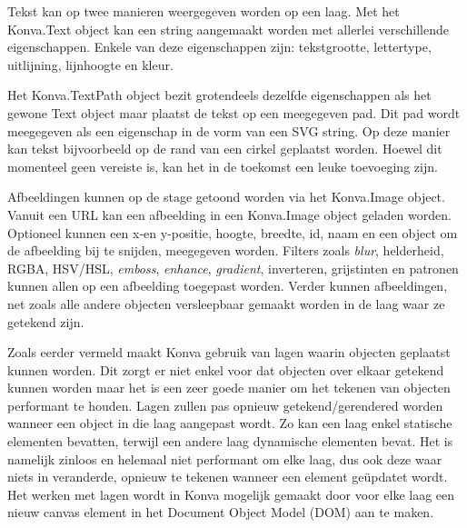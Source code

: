 Tekst kan op twee manieren weergegeven worden op een laag. Met het Konva.Text object kan een string aangemaakt worden met allerlei verschillende eigenschappen. Enkele van deze eigenschappen zijn: tekstgrootte, lettertype, uitlijning, lijnhoogte en kleur. 

Het Konva.TextPath object bezit grotendeels dezelfde eigenschappen als het gewone Text object maar plaatst de tekst op een meegegeven pad. Dit pad wordt meegegeven als een eigenschap in de vorm van een SVG string. Op deze manier kan tekst bijvoorbeeld op de rand van een cirkel geplaatst worden. Hoewel dit momenteel geen vereiste is, kan het in de toekomst een leuke toevoeging zijn.

Afbeeldingen kunnen op de stage getoond worden via het Konva.Image object. Vanuit een URL kan een afbeelding in een Konva.Image object geladen worden. Optioneel kunnen een x-en y-positie, hoogte, breedte, id, naam en een object om de afbeelding bij te snijden, meegegeven worden. Filters zoals \textit{blur}, helderheid, RGBA, HSV/HSL, \textit{emboss}, \textit{enhance}, \textit{gradient}, inverteren, grijstinten en patronen kunnen allen op een afbeelding toegepast worden. Verder kunnen afbeeldingen, net zoals alle andere objecten versleepbaar gemaakt worden in de laag waar ze getekend zijn. 

Zoals eerder vermeld maakt Konva gebruik van lagen waarin objecten geplaatst kunnen worden. Dit zorgt er niet enkel voor dat objecten over elkaar getekend kunnen worden maar het is een zeer goede manier om het tekenen van objecten performant te houden. Lagen zullen pas opnieuw getekend/gerendered worden wanneer een object in die laag aangepast wordt. Zo kan een laag enkel statische elementen bevatten, terwijl een andere laag dynamische elementen bevat. Het is namelijk zinloos en helemaal niet performant om elke laag, dus ook deze waar niets in veranderde, opnieuw te tekenen wanneer een element ge\"{u}pdatet wordt. Het werken met lagen wordt in Konva mogelijk gemaakt door voor elke laag een nieuw canvas element in het Document Object Model (DOM) aan te maken. %

